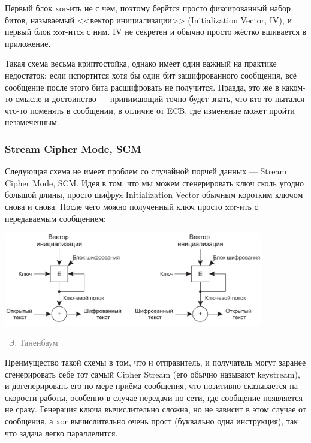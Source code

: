 \documentclass[a5paper]{article}
\newcommand{\attribution}[1] {
\vspace{-5mm}\begin{flushright}\begin{scriptsize}\textcolor{gray}{\textcopyright\, #1}\end{scriptsize}\end{flushright}
}
\begin{document}
Первый блок xor-ить не с чем, поэтому берётся просто фиксированный набор битов, называемый <<вектор инициализации>> (Initialization Vector, IV), и первый блок xor-ится с ним. IV не секретен и обычно просто жёстко вшивается в приложение.

Такая схема весьма криптостойка, однако имеет один важный на практике недостаток: если испортится хотя бы один бит зашифрованного сообщения, всё сообщение после этого бита расшифровать не получится. Правда, это же в каком-то смысле и достоинство --- принимающий точно будет знать, что кто-то пытался что-то поменять в сообщении, в отличие от ECB, где изменение может пройти незамеченным.

\subsubsection{Stream Cipher Mode, SCM}

Следующая схема не имеет проблем со случайной порчей данных --- Stream Cipher Mode, SCM. Идея в том, что мы можем сгенерировать ключ сколь угодно большой длины, просто шифруя Initialization Vector обычным коротким ключом снова и снова. После чего можно полученный ключ просто xor-ить с передаваемым сообщением: 

\begin{center}
    \includegraphics[width=0.85\textwidth]{scm.png}
    \attribution{Э. Таненбаум}
\end{center}

Преимущество такой схемы в том, что и отправитель, и получатель могут заранее сгенерировать себе тот самый Cipher Stream (его обычно называют keystream), и догенерировать его по мере приёма сообщения, что позитивно сказывается на скорости работы, особенно в случае передачи по сети, где сообщение появляется не сразу. Генерация ключа вычислительно сложна, но не зависит в этом случае от сообщения, а xor вычислительно очень прост (буквально одна инструкция), так что задача легко параллелится.
\end{document}

